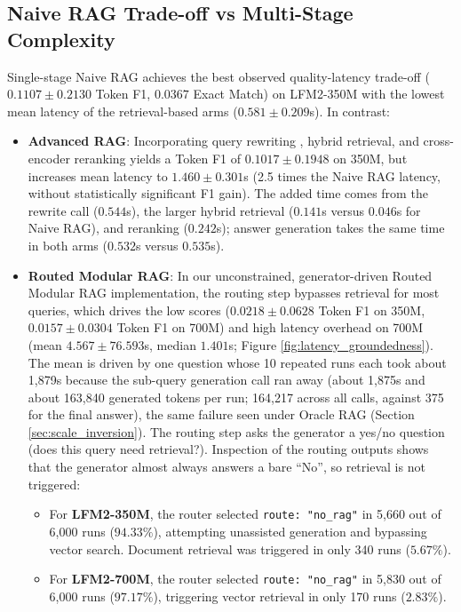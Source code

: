 \documentclass[10pt]{article}
\begin{document}
\subsection{Naive RAG Trade-off vs Multi-Stage Complexity}
Single-stage Naive RAG achieves the best observed quality-latency trade-off ($0.1107 \pm 0.2130$ Token F1, $0.0367$ Exact Match) on LFM2-350M with the lowest mean latency of the retrieval-based arms ($0.581 \pm 0.209$s). In contrast:
\begin{itemize}
    \item \textbf{Advanced RAG}: Incorporating query rewriting \citep{ma2023query}, hybrid retrieval, and cross-encoder reranking \citep{nogueira2019passage} yields a Token F1 of $0.1017 \pm 0.1948$ on 350M, but increases mean latency to $1.460 \pm 0.301$s (2.5 times the Naive RAG latency, without statistically significant F1 gain). The added time comes from the rewrite call ($0.544$s), the larger hybrid retrieval ($0.141$s versus $0.046$s for Naive RAG), and reranking ($0.242$s); answer generation takes the same time in both arms ($0.532$s versus $0.535$s).
    \item \textbf{Routed Modular RAG}: In our unconstrained, generator-driven Routed Modular RAG implementation, the routing step bypasses retrieval for most queries, which drives the low scores ($0.0218 \pm 0.0628$ Token F1 on 350M, $0.0157 \pm 0.0304$ Token F1 on 700M) and high latency overhead on 700M (mean $4.567 \pm 76.593$s, median $1.401$s; Figure \ref{fig:latency_groundedness}). The mean is driven by one question whose 10 repeated runs each took about 1,879s because the sub-query generation call ran away (about 1,875s and about 163,840 generated tokens per run; 164,217 across all calls, against 375 for the final answer), the same failure seen under Oracle RAG (Section \ref{sec:scale_inversion}). The routing step asks the generator a yes/no question (does this query need retrieval?). Inspection of the routing outputs shows that the generator almost always answers a bare ``No'', so retrieval is not triggered:
    \begin{itemize}
        \item For \textbf{LFM2-350M}, the router selected \texttt{route: "no\_rag"} in 5,660 out of 6,000 runs ($94.33\%$), attempting unassisted generation and bypassing vector search. Document retrieval was triggered in only 340 runs ($5.67\%$).
        \item For \textbf{LFM2-700M}, the router selected \texttt{route: "no\_rag"} in 5,830 out of 6,000 runs ($97.17\%$), triggering vector retrieval in only 170 runs ($2.83\%$).
    \end{itemize}
\end{itemize}
\end{document}
